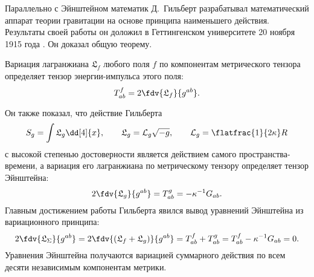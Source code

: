 \documentclass[\docroot/reports/draft/report.tex]{subfiles}
\begin{document}
    Параллельно с Эйнштейном математик Д.~Гильберт разрабатывал математический аппарат теории гравитации на основе принципа наименьшего действия. Результаты своей работы он доложил в Геттингенском университете 20 ноября 1915 года \cite{gilbert_phys}. Он доказал общую теорему.
    \begin{theorem*}
        Вариация лагранжиана $\mathfrak{L}_f$ любого поля $f$ по компонентам метрического тензора определяет тензор энергии-импульса этого поля:
        \begin{equation*}
            T^f_{ab} = 2 \fdv{\mathfrak{L}_f}{g^{ab}} .
        \end{equation*}
    \end{theorem*}
    Он также показал, что действие Гильберта
    \begin{equation*}
        S_g = \int \mathfrak{L}_g \dd[4]{x} , \qquad \mathfrak{L}_g = \mathcal{L}_g \sqrt{-g} , \qquad \mathcal{L}_g = \flatfrac{1}{2 \kappa} R
    \end{equation*}
    с высокой степенью достоверности является действием самого пространства-времени, а вариация его лагранжиана по метрическому тензору определяет тензор Эйнштейна:
    \begin{equation*}
        2\fdv{\mathfrak{L}_g}{g^{ab}} = T^g_{ab} = - \kappa^{-1} G_{ab} .
    \end{equation*}
    Главным достижением работы Гильберта явился вывод уравнений Эйнштейна из вариационного принципа:
    \begin{equation*}
        2 \fdv{\mathfrak{L}_\Sigma}{g^{ab}} =
        2 \fdv{(\mathfrak{L}_f + \mathfrak{L}_g)}{g^{ab}} =
        T^f_{ab} + T^g_{ab} =
        T^f_{ab} - \kappa^{-1} G_{ab} =
        0 .
    \end{equation*}
    Уравнения Эйнштейна получаются вариацией суммарного действия по всем десяти независимым компонентам метрики.

\end{document}
